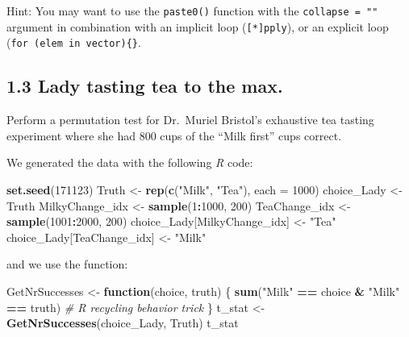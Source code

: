 \documentclass[]{article}
\newenvironment{Shaded}{\begin{snugshade}}{\end{snugshade}}
\newcommand{\CommentTok}[1]{\textcolor[rgb]{0.56,0.35,0.01}{\textit{#1}}}
\newcommand{\ControlFlowTok}[1]{\textcolor[rgb]{0.13,0.29,0.53}{\textbf{#1}}}
\newcommand{\DataTypeTok}[1]{\textcolor[rgb]{0.13,0.29,0.53}{#1}}
\newcommand{\DecValTok}[1]{\textcolor[rgb]{0.00,0.00,0.81}{#1}}
\newcommand{\KeywordTok}[1]{\textcolor[rgb]{0.13,0.29,0.53}{\textbf{#1}}}
\newcommand{\NormalTok}[1]{#1}
\newcommand{\OperatorTok}[1]{\textcolor[rgb]{0.81,0.36,0.00}{\textbf{#1}}}
\newcommand{\StringTok}[1]{\textcolor[rgb]{0.31,0.60,0.02}{#1}}
\begin{document}
Hint: You may want to use the \texttt{paste0()} function with the
\texttt{collapse\ =\ ""} argument in combination with an implicit loop
(\texttt{{[}*{]}pply}), or an explicit loop
(\texttt{for\ (elem\ in\ vector)\{\}}.

\hypertarget{lady-tasting-tea-to-the-max.}{%
\subsection{1.3 Lady tasting tea to the
max.}\label{lady-tasting-tea-to-the-max.}}

Perform a permutation test for Dr.~Muriel Bristol's exhaustive tea
tasting experiment where she had 800 cups of the ``Milk first'' cups
correct.

We generated the data with the following \emph{R} code:

\begin{Shaded}
\begin{Highlighting}[]
\KeywordTok{set.seed}\NormalTok{(}\DecValTok{171123}\NormalTok{)}
\NormalTok{Truth <-}\StringTok{ }\KeywordTok{rep}\NormalTok{(}\KeywordTok{c}\NormalTok{(}\StringTok{"Milk"}\NormalTok{, }\StringTok{"Tea"}\NormalTok{), }\DataTypeTok{each =} \DecValTok{1000}\NormalTok{)}
\NormalTok{choice_Lady <-}\StringTok{ }\NormalTok{Truth}
\NormalTok{MilkyChange_idx <-}\StringTok{ }\KeywordTok{sample}\NormalTok{(}\DecValTok{1}\OperatorTok{:}\DecValTok{1000}\NormalTok{, }\DecValTok{200}\NormalTok{)}
\NormalTok{TeaChange_idx <-}\StringTok{ }\KeywordTok{sample}\NormalTok{(}\DecValTok{1001}\OperatorTok{:}\DecValTok{2000}\NormalTok{, }\DecValTok{200}\NormalTok{)}
\NormalTok{choice_Lady[MilkyChange_idx] <-}\StringTok{ "Tea"}
\NormalTok{choice_Lady[TeaChange_idx] <-}\StringTok{ "Milk"}
\end{Highlighting}
\end{Shaded}

and we use the function:

\begin{Shaded}
\begin{Highlighting}[]
\NormalTok{GetNrSuccesses <-}\StringTok{ }\ControlFlowTok{function}\NormalTok{(choice, truth) \{}
  \KeywordTok{sum}\NormalTok{(}\StringTok{"Milk"} \OperatorTok{==}\StringTok{ }\NormalTok{choice }\OperatorTok{&}\StringTok{ "Milk"} \OperatorTok{==}\StringTok{ }\NormalTok{truth) }\CommentTok{# R recycling behavior trick}
\NormalTok{\}}
\NormalTok{t_stat <-}\StringTok{ }\KeywordTok{GetNrSuccesses}\NormalTok{(choice_Lady, Truth)}
\NormalTok{t_stat}
\end{Highlighting}
\end{Shaded}
\end{document}
